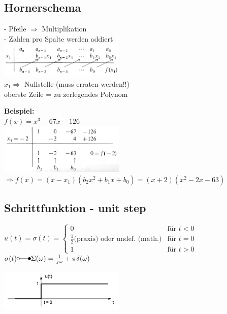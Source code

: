 \subsection{Hornerschema}
	\begin{minipage}[t]{9cm}
		- Pfeile $\Rightarrow$ Multiplikation\\
		- Zahlen pro Spalte werden addiert\\
		\includegraphics[width=6cm]{./bilder/hornerschema_1.png}\\
		$x_1 \Rightarrow$ Nullstelle (muss erraten werden!!)\\
		oberste Zeile = zu zerlegendes Polynom			
	\end{minipage}
	\begin{minipage}[t]{9cm}
		\textbf{Beispiel:}\\
		$f(x) = x^3-67x-126$\\
		\includegraphics[width=6cm]{./bilder/hornerschema_2.png}\\
		$\Rightarrow f(x) = (x-x_1)(b_2x^2 + b_1x + b_0) = (x+2)(x^2-2x-63)$	
	\end{minipage}

\newpage

\subsection{Schrittfunktion - unit step}
	\begin{minipage}{10cm}
		$u(t) = \sigma(t) =	\begin{cases}
		  		 0 & \text{für } t < 0 \\
		  		 \frac{1}{2} \text{(praxis)}  \text{ oder undef. (math.)} & \text{für } t = 0 \\
		  		 1 & \text{für } t > 0
		  	\end{cases}
		$
		$\sigma(t) \laplace \Sigma(\omega) = \frac{1}{j\omega} + \pi\delta(\omega)$
	\end{minipage}
	\begin{minipage}{8cm}
		\includegraphics[width=6cm]{./bilder/unitstep.png}
	\end{minipage}

